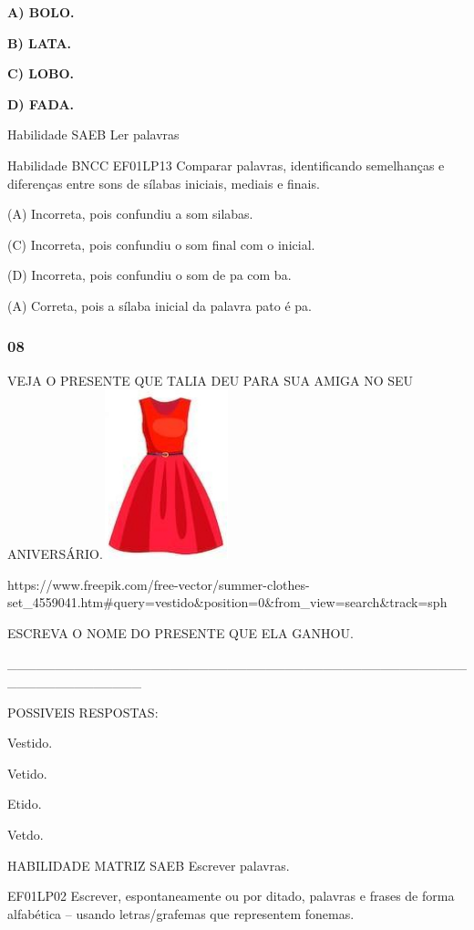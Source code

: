 \begin{escola}
\textbf{A) BOLO.}

\textbf{B) LATA.}

\textbf{C) LOBO.}

\textbf{D) FADA.}

Habilidade SAEB Ler palavras

Habilidade BNCC EF01LP13 Comparar palavras, identificando semelhanças e
diferenças entre sons de sílabas iniciais, mediais e finais.

(A) Incorreta, pois confundiu a som silabas.

(C) Incorreta, pois confundiu o som final com o inicial.

(D) Incorreta, pois confundiu o som de pa com ba.

(A) Correta, pois a sílaba inicial da palavra pato é
pa.\protect\hypertarget{_heading=h.7lb9brf4wytg}{}{}

\subsubsection{08 }\label{section-64}

VEJA O PRESENTE QUE TALIA DEU PARA SUA AMIGA NO SEU
ANIVERSÁRIO.\includegraphics[width=1.45972in,height=1.93403in]{media/image232.jpg}

https://www.freepik.com/free-vector/summer-clothes-set\_4559041.htm\#query=vestido\&position=0\&from\_view=search\&track=sph

ESCREVA O NOME DO PRESENTE QUE ELA GANHOU.

\_\_\_\_\_\_\_\_\_\_\_\_\_\_\_\_\_\_\_\_\_\_\_\_\_\_\_\_\_\_\_\_\_\_\_\_\_\_\_\_\_\_\_\_\_\_\_\_\_\_\_\_\_\_\_\_\_\_\_\_\_\_

POSSIVEIS RESPOSTAS:

Vestido.

Vetido.

Etido.

Vetdo.

HABILIDADE MATRIZ SAEB Escrever palavras.

EF01LP02 Escrever, espontaneamente ou por ditado, palavras e frases de
forma alfabética -- usando letras/grafemas que representem fonemas.


\end{escola}
